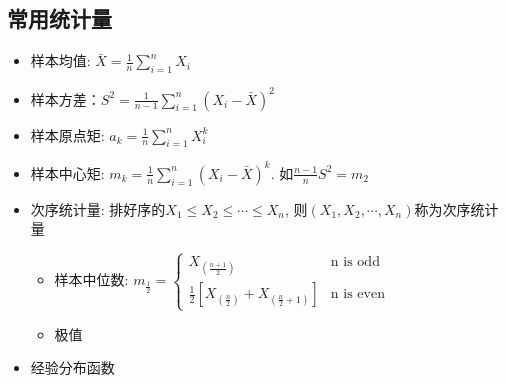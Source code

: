 \documentclass[UTF8]{article}
\begin{document}
\subsection{常用统计量}
\begin{itemize}
\item 样本均值: $\bar{X}=\frac{1}{n}\sum\limits_{i=1}^nX_i$
\item 样本方差：$S^2=\frac{1}{n-1}\sum\limits_{i=1}^n(X_i-\bar{X})^2$
\item 样本原点矩: $a_k=\frac{1}{n}\sum\limits_{i=1}^nX_i^k$
\item 样本中心矩: $m_k=\frac{1}{n}\sum\limits_{i=1}^n(X_i-\bar{X})^k$. 如$\frac{n-1}{n}S^2=m_2$
\item 次序统计量: 排好序的$X_1\le X_2\le\cdots\le X_n$, 则$(X_1, X_2,\cdots, X_n)$称为次序统计量
	\begin{itemize}
	\item 样本中位数: $m_{\frac{1}{2}}=\left\{\begin{array}{ll}
	X_{(\frac{n+1}{2})}&\mbox{n is odd}\\
	\frac{1}{2}\left[X_{(\frac{n}{2})}+X_{(\frac{n}{2}+1)}\right]&\mbox{n is even}
	\end{array}\right.$
	\item 极值
	\end{itemize}
\item 经验分布函数
\end{itemize}
\end{document}
